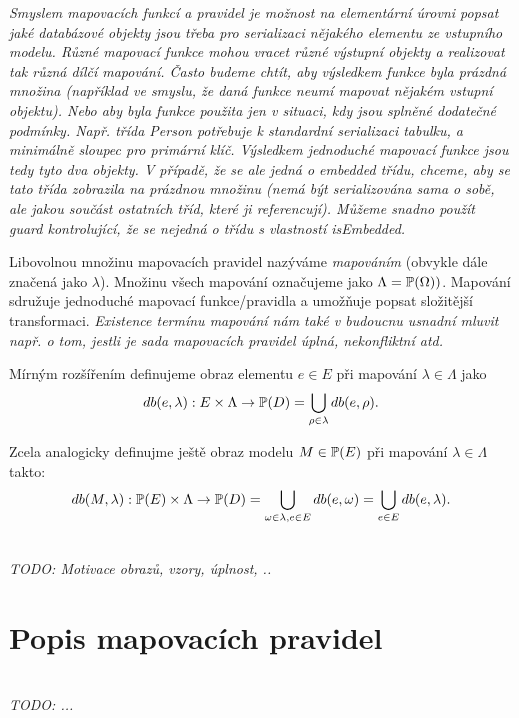 \emph{Smyslem mapovacích funkcí a pravidel je možnost na elementární
  úrovni popsat jaké databázové objekty jsou třeba pro serializaci
  nějakého elementu ze vstupního modelu. Různé mapovací funkce mohou
  vracet různé výstupní objekty a realizovat tak různá dílčí
  mapování. Často budeme chtít, aby výsledkem funkce byla prázdná
  množina (například ve smyslu, že daná funkce neumí mapovat nějakém
  vstupní objektu). Nebo aby byla funkce použita jen v situaci, kdy
  jsou splněné dodatečné podmínky. Např. třída \emph{Person} potřebuje
  k standardní serializaci tabulku, a minimálně sloupec pro primární
  klíč. Výsledkem jednoduché mapovací funkce jsou tedy tyto dva
  objekty. V případě, že se ale jedná o embedded třídu, chceme, aby se
  tato třída zobrazila na prázdnou množinu (nemá být serializována
  sama o sobě, ale jakou součást ostatních tříd, které ji
  referencují). Můžeme snadno použít guard kontrolující, že se nejedná
  o třídu s vlastností isEmbedded.}


Libovolnou množinu mapovacích pravidel nazýváme \emph{mapováním}
(obvykle dále značená jako $\lambda$). Množinu všech mapování
označujeme jako $\Lambda = \mathbb{P}(\Omega))$. Mapování
sdružuje jednoduché mapovací funkce/pravidla a umožňuje popsat
složitější transformaci. \emph{Existence termínu mapování nám také v
  budoucnu usnadní mluvit např. o tom, jestli je sada mapovacích
  pravidel úplná, nekonfliktní atd. }

Mírným rozšířením definujeme obraz elementu $e \in E$ při mapování
$\lambda \in \Lambda$ jako
\begin{equation}
db(e, \lambda) : E \times
  \Lambda \to \mathbb{P}(D) = \bigcup_{\rho \in \lambda}{db(e, \rho)}.
\end{equation}

Zcela analogicky definujme ještě obraz modelu $M \in \mathbb{P}(E)$ při
mapování $\lambda \in \Lambda$ takto:
\begin{equation}
db(M, \lambda) : \mathbb{P}(E)\times \Lambda \to \mathbb{P}(D)
= \bigcup_{\omega \in \lambda, e \in E}{db(e, \omega)} = \bigcup_{e \in E}{db(e,
  \lambda)}.
\end{equation}

\emph{
\\TODO: Motivace obrazů, vzory, úplnost, ..
}

\section{Popis mapovacích pravidel}
\label{sec:rules}

\emph{
\\TODO: ...
}


